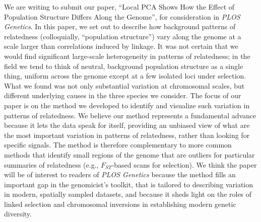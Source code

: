 \documentclass[stdletter,letterpaper,addrfromright,orderfromdateto,dateleft,11pt,noaddrto,sigleft]{newlfm}
\begin{document}
\begin{newlfm}




We are writing to submit our paper,
``Local PCA Shows How the Effect of Population Structure Differs Along the Genome'',
for consideration in \textit{PLOS Genetics}.
In this paper, we set out to describe how background patterns of relatedness 
(colloquially, ``population structure'')
vary along the genome at a scale larger than correlations induced by linkage.
It was not certain that we would find significant large-scale heterogeneity in patterns of relatedness;
in the field we tend to think of neutral, background population structure as a single thing,
uniform across the genome except at a few isolated loci under selection.
What we found was not only substantial variation at chromosomal scales,
but different underlying causes in the three species we consider.
The focus of our paper is on the method we developed to identify and visualize such variation in patterns of relatedness.
We believe our method represents a fundamental advance because it lets the data speak for itself,
providing an unbiased view of what are the most important variation in patterns of relatedness,
rather than looking for specific signals.
The method is therefore complementary to more common methods that identify small regions of the genome
that are outliers for particular summaries of relatedness (e.g., $F_{ST}$-based scans for selection).
We think the paper will be of interest to readers of \textit{PLOS Genetics}
because the method fills an important gap in the genomicist's toolkit,
that is tailored to describing variation in modern, spatially sampled datasets,
and because it sheds light on the roles of linked selection and chromosomal inversions in 
establishing modern genetic diversity.


\end{newlfm}
\end{document}
